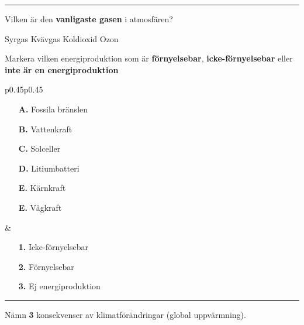 \documentclass{exam}
\begin{document}
\begin{questions}
\vspace{5mm} 
\hrule 
\vspace{5mm} 

\question Vilken är den \textbf{vanligaste gasen} i atmosfären?
\begin{checkboxes}
   \choice Syrgas
   \choice Kvävgas
   \choice Koldioxid
   \choice Ozon
\end{checkboxes}

\break


\vspace{5mm} %
\begin{center}
\end{center}
\vspace{5mm} %
\question Markera vilken energiproduktion som är \textbf{förnyelsebar}, \textbf{icke-förnyelsebar} eller \textbf{inte är en energiproduktion}

\begin{tabular}{p{0.45\textwidth}p{0.45\textwidth}}
  \begin{minipage}[t]{\linewidth}
    \begin{itemize}
      \item[\textbf{A.}] Fossila bränslen
      \item[\textbf{B.}] Vattenkraft
      \item[\textbf{C.}] Solceller
      \item[\textbf{D.}] Litiumbatteri
      \item[\textbf{E.}] Kärnkraft
      \item[\textbf{E.}] Vågkraft
    \end{itemize}
  \end{minipage}
  &
  \begin{minipage}[t]{\linewidth}
    \begin{itemize}
      \item[\textbf{1.}] Icke-förnyelsebar
      \item[\textbf{2.}] Förnyelsebar
      \item[\textbf{3.}] Ej energiproduktion
    \end{itemize}
  \end{minipage}
\end{tabular}
\vspace{5mm} 
\hrule 
\vspace{5mm}
\question 
Nämn \textbf{3} konsekvenser av klimatförändringar (global uppvärmning).


\end{questions}
\end{document}

